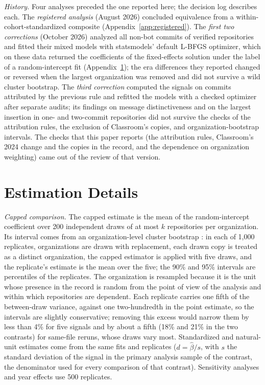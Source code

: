 \documentclass[acmsmall,screen,review,anonymous]{acmart}
\begin{document}
\textit{History.} Four analyses preceded the one reported here; the decision log describes each. The \textit{registered analysis} (August 2026) concluded equivalence from a within-cohort-standardized composite (Appendix~\ref{app:registered}). The \textit{first two corrections} (October 2026) analyzed all non-bot commits of verified repositories and fitted their mixed models with statsmodels' default L-BFGS optimizer, which on these data returned the coefficients of the fixed-effects solution under the label of a random-intercept fit (Appendix~\ref{app:estimation}); the era differences they reported changed or reversed when the largest organization was removed and did not survive a wild cluster bootstrap. The \textit{third correction} computed the signals on commits attributed by the previous rule and refitted the models with a checked optimizer after separate audits; its findings on message distinctiveness and on the largest insertion in one- and two-commit repositories did not survive the checks of the attribution rules, the exclusion of Classroom's copies, and organization-bootstrap intervals. The checks that this paper reports (the attribution rules, Classroom's 2024 change and the copies in the record, and the dependence on organization weighting) came out of the review of that version.
\FloatBarrier
\section{Estimation Details}
\label{app:estimation}

\textit{Capped comparison.} The capped estimate is the mean of the random-intercept coefficient over 200 independent draws of at most $k$ repositories per organization. Its interval comes from an organization-level cluster bootstrap \citep{cameron2008bootstrap, cameron2015practitioner}: in each of 1,000 replicates, organizations are drawn with replacement, each drawn copy is treated as a distinct organization, the capped estimator is applied with five draws, and the replicate's estimate is the mean over the five; the 90\% and 95\% intervals are percentiles of the replicates. The organization is resampled because it is the unit whose presence in the record is random from the point of view of the analysis and within which repositories are dependent. Each replicate carries one fifth of the between-draw variance, against one two-hundredth in the point estimate, so the intervals are slightly conservative; removing this excess would narrow them by less than 4\% for five signals and by about a fifth (18\% and 21\% in the two contrasts) for same-file reruns, whose draws vary most. Standardized and natural-unit estimates come from the same fits and replicates ($d = \hat\beta / s$, with $s$ the standard deviation of the signal in the primary analysis sample of the contrast, the denominator used for every comparison of that contrast). Sensitivity analyses and year effects use 500 replicates.
\end{document}
